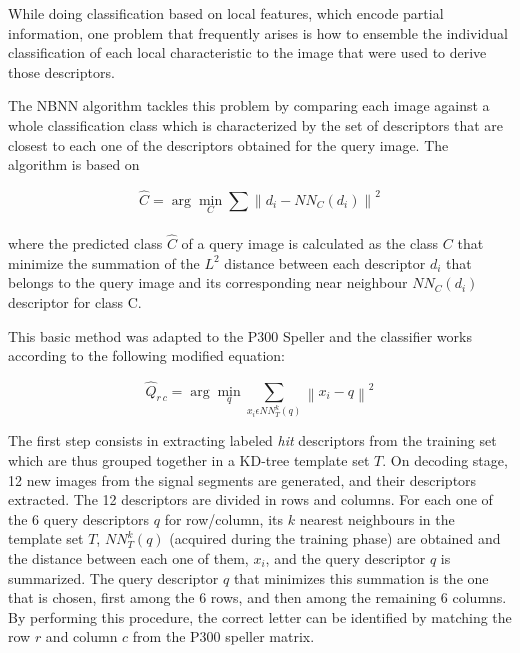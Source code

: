\documentclass[entropy,article,submit,moreauthors,pdftex,10pt,a4paper]{mdpi}
\begin{document}

While doing classification based on local features, which encode partial information, one problem that frequently arises is how to ensemble the individual classification of each local characteristic to the image that were used to derive those descriptors.

The NBNN algorithm tackles this problem by comparing each image against a whole classification class which is characterized by the set of descriptors that are closest to each one of the descriptors obtained for the query image.  The algorithm is based on 

\begin{equation}
\hat{C} = \arg \min_C \sum_{}^{} \left\lVert d_i - NN_C(d_i) \right\rVert ^2
\label{eq:classification}
\end{equation}

\noindent where the predicted class $\hat{C}$ of a query image is calculated as the class $ C $ that minimize the summation of the $ L^2 $ distance between each descriptor $ d_i $ that belongs to the query image and its corresponding near neighbour $ NN_C(d_i) $ descriptor for class C.

This basic method was adapted to the P300 Speller and the classifier works according to the following modified equation:

\begin{equation}
\hat{Q}_{r\,c} = \arg \min_q \sum_{x_i \epsilon NN_T^k(q)}^{} \left\lVert x_i - q \right\rVert ^2
\label{eq:multiclassification}
\end{equation}

The first step consists in extracting labeled \textit{hit} descriptors from the training set which are thus grouped together in a KD-tree \citep{Vedaldi2010} template set $ T $.  On decoding stage, 12 new images from the signal segments are generated, and their descriptors extracted.  The 12 descriptors are divided in rows and columns.  For each one of the 6 query descriptors $ q $ for row/column, its $ k $ nearest neighbours in the template set $T$, $ NN_T^k(q) $ (acquired during the training phase)  are obtained and the distance between each one of them, $ x_i $, and the query descriptor $ q $ is summarized.  The query descriptor $ q $ that minimizes this summation is the one that is chosen, first among the 6 rows, and then among the remaining 6 columns.  By performing this procedure, the correct letter can be identified by matching the row $ r $ and column $ c $ from the P300 speller matrix.   
\end{document}
